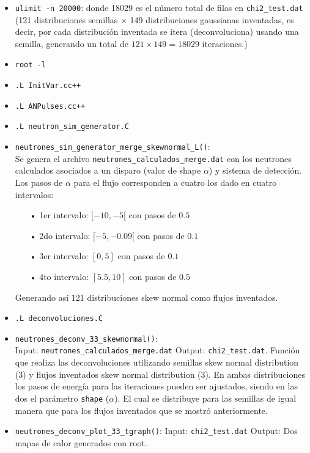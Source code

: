 \documentclass[11pt,letterpaper]{article}
\begin{document}
\begin{itemize}
\item \verb|ulimit -n 20000|: donde 18029  es el número total de filas en \verb|chi2_test.dat| (121 distribuciones semillas $\times$ 149 distribuciones gaussianas inventadas, es decir, por cada distribución inventada se itera (deconvoluciona) usando una semilla, generando un total de $121 \times 149=18029$ iteraciones.)
\item \verb|root -l|
\item \verb|.L InitVar.cc++|
\item \verb|.L ANPulses.cc++|
\item \verb|.L neutron_sim_generator.C|
\item \verb|neutrones_sim_generator_merge_skewnormal_L()|: \\
Se genera el archivo \verb|neutrones_calculados_merge.dat| con los neutrones calculados asociados a un disparo (valor de shape $\alpha$) y sistema de detección. Los pasos de $\alpha$ para el flujo corresponden a cuatro los dado en cuatro intervalos:

\begin{itemize}
\item[•] 1er intervalo: $[-10,-5[$ con pasos de $0.5$
\item[•] 2do intervalo: $[-5,-0.09[$ con pasos de $0.1$
\item[•] 3er intervalo: $[0,5]$ con pasos de $0.1$
\item[•] 4to intervalo: $[5.5,10]$ con pasos de $0.5$
\end{itemize}

Generando así 121 distribuciones skew normal como flujos inventados.

\item \verb|.L deconvoluciones.C|
\item \verb|neutrones_deconv_33_skewnormal()|: \\
Input: \verb|neutrones_calculados_merge.dat| Output:  \verb|chi2_test.dat|.
Función que realiza las deconvoluciones utilizando semillas skew normal distribution (3) y flujos inventados skew normal distribution (3). En ambas distribuciones los pasos de energía para las iteraciones pueden ser ajustados, siendo en las dos el parámetro \verb|shape| ($\alpha$). El cual se distribuye para las semillas de igual manera que para los flujos inventados que se mostró anteriormente.

\item \verb|neutrones_deconv_plot_33_tgraph()|: Input: \verb|chi2_test.dat| Output: Dos mapas de calor generados con root.

\end{itemize}
\end{document}
